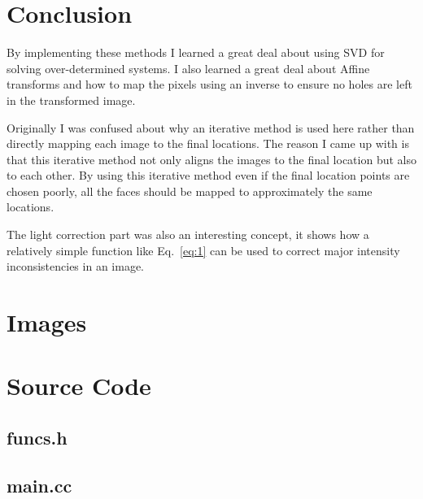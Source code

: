 \section{Conclusion}

  By implementing these methods I learned a great deal about using SVD for solving over-determined systems.  I also learned a great deal about Affine transforms and how to map the pixels using an inverse to ensure no holes are left in the transformed image.

  Originally I was confused about why an iterative method is used here rather than directly mapping each image to the final locations.  The reason I came up with is that this iterative method not only aligns the images to the final location but also to each other.  By using this iterative method even if the final location points are chosen poorly, all the faces should be mapped to approximately the same locations.

  The light correction part was also an interesting concept, it shows how a relatively simple function like Eq.~\ref{eq:1} can be used to correct major intensity inconsistencies in an image.

\newpage

\section{Images}
  

\newpage

\section{Source Code}
  \subsection{funcs.h}
    
	\subsection{main.cc}
    
